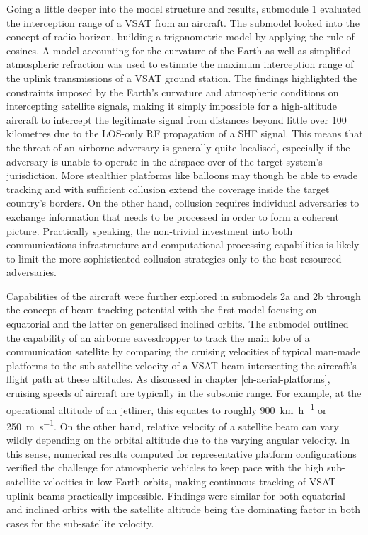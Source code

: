 \documentclass[english, 12pt, a4paper, elec, utf8, a-1b, online]{aaltothesis}
\begin{document}
Going a little deeper into the model structure and results, submodule 1 evaluated the interception range of a VSAT from an aircraft. The submodel looked into the concept of radio horizon, building a trigonometric model by applying the rule of cosines.
A model accounting for the curvature of the Earth as well as simplified atmospheric refraction was used to estimate the maximum interception range of the uplink transmissions of a VSAT ground station. The findings highlighted the constraints imposed by the Earth's curvature and atmospheric conditions on intercepting satellite signals, making it simply impossible for a high-altitude aircraft to intercept the legitimate signal from distances beyond little over 100 kilometres due to the LOS-only RF propagation of a SHF signal.
This means that the threat of an airborne adversary is generally quite localised, especially if the adversary is unable to operate in the airspace over of the target system's jurisdiction. More stealthier platforms like balloons may though be able to evade tracking and with sufficient collusion extend the coverage inside the target country's borders. On the other hand, collusion requires individual adversaries to exchange information that needs to be processed in order to form a coherent picture. Practically speaking, the non-trivial investment into both communications infrastructure and computational processing capabilities is likely to limit the more sophisticated collusion strategies only to the best-resourced adversaries. %

Capabilities of the aircraft were further explored in submodels 2a and 2b through the concept of beam tracking potential with the first model focusing on equatorial and the latter on generalised inclined orbits. The submodel outlined the capability of an airborne eavesdropper to track the main lobe of a communication satellite by comparing the cruising velocities of typical man-made platforms to the sub-satellite velocity of a VSAT beam intersecting the aircraft's flight path at these altitudes.
As discussed in chapter \ref{ch-aerial-platforms}, cruising speeds of aircraft are typically in the subsonic range.
For example, at the operational altitude of an jetliner, this equates to roughly \SI[per-mode=repeated-symbol]{900}{\kilo\meter\per\hour} or \SI[per-mode=repeated-symbol]{250}{\meter\per\second}.
On the other hand, relative velocity of a satellite beam can vary wildly depending on the orbital altitude due to the varying angular velocity.
In this sense, numerical results computed for representative platform configurations verified the challenge for atmospheric vehicles to keep pace with the high sub-satellite velocities in low Earth orbits, making continuous tracking of VSAT uplink beams practically impossible. Findings were similar for both equatorial and inclined orbits with the satellite altitude being the dominating factor in both cases for the sub-satellite velocity.
\end{document}
